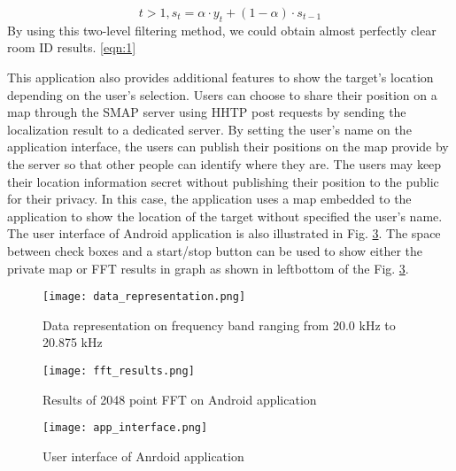 \begin{equation}
t>1, s_t=\alpha \cdot y_t+(1-\alpha)\cdot s_{t-1}
\label{eqn:1}
\end{equation}
By using this two-level filtering method, we could obtain almost perfectly clear room ID results.
\ref{eqn:1}

This application also provides additional features to show the target’s location depending on the user’s selection. Users can choose to share their position on a map through the SMAP server using HHTP post requests by sending the localization result to a dedicated server. By setting the user’s name on the application interface, the users can publish their positions on the map provide by the server so that other people can identify where they are. The users may keep their location information secret without publishing their position to the public for their privacy. In this case, the application uses a map embedded to the application to show the location of the target without specified the user’s name. The user interface of Android application is also illustrated in Fig. \ref{fig:app_interface}. The space between check boxes and a start/stop button can be used to show either the private map or FFT results in graph as shown in leftbottom of the Fig. \ref{fig:app_interface}.

\begin{figure}
  \centering
  \texttt{[image: data\_representation.png]}
  \caption{Data representation on frequency band ranging from 20.0 kHz to 20.875 kHz}
  \label{fig:data_representation}
\end{figure}

\begin{figure}
  \centering
  \texttt{[image: fft\_results.png]}
  \caption{Results of 2048 point FFT on Android application}
  \label{fig:fft_results}
\end{figure}

\begin{figure}
  \centering
  \texttt{[image: app\_interface.png]}
  \caption{User interface of Anrdoid application}
  \label{fig:app_interface}
\end{figure}

